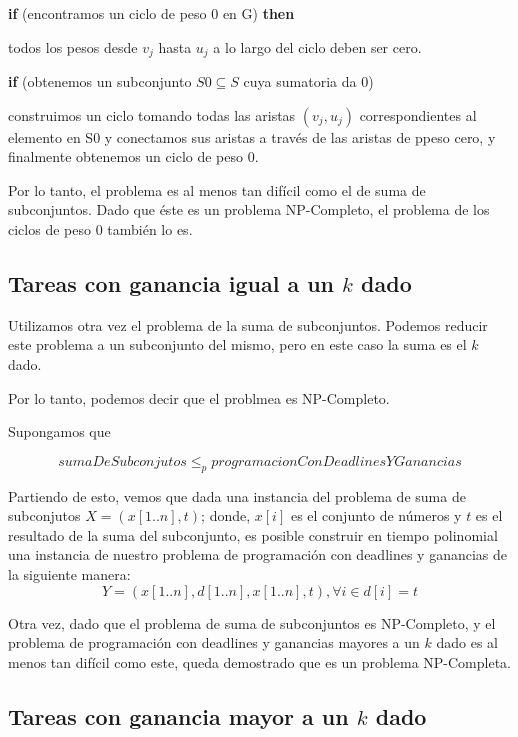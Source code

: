 \documentclass[a4paper,10pt]{article}
\begin{document}
\textbf{\textcolor[rgb]{0.0,0.5019608,0.0}{if}} (encontramos un ciclo de peso 0 en G) \textbf{\textcolor[rgb]{0.0,0.5019608,0.0}{then}}

\quad todos los pesos desde \( v_{j} \) hasta \( u_{j} \) a lo largo del ciclo deben ser cero.
		
\textbf{\textcolor[rgb]{0.0,0.5019608,0.0}{if}} (obtenemos un subconjunto \( S0 \subseteq S \) cuya sumatoria da 0)

\quad construimos un ciclo tomando todas las aristas \( (v_{j}, u_{j}) \) correspondientes al elemento en S0 y conectamos sus aristas a través de las aristas de ppeso cero, y finalmente obtenemos un ciclo de peso 0.

\bigskip

Por lo tanto, el problema es al menos tan difícil como el de suma de subconjuntos. Dado que éste es un problema NP-Completo, el problema de los ciclos de peso 0 también lo es.

\subsection{Tareas con ganancia igual a un \(k\) dado}

Utilizamos otra vez el problema de la suma de subconjuntos. Podemos reducir este problema a un subconjunto del mismo, pero en este caso la suma es el \(k\) dado.

Por lo tanto, podemos decir que el problmea es NP-Completo.

Supongamos que

\[ sumaDeSubconjutos \le_{p} programacionConDeadlinesYGanancias \]

Partiendo de esto, vemos que dada una instancia del problema de suma de subconjutos \(X = (x[1..n], t)\); donde, \(x[i]\) es el conjunto de números y \(t\) es el resultado de la suma del subconjunto, es posible construir en tiempo polinomial una instancia de nuestro problema de programación con deadlines y ganancias de la siguiente manera: 
\[ Y = ( x[1..n], d[1..n], x[1..n], t ), \forall i \in d[i] = t \]

Otra vez, dado que el problema de suma de subconjuntos es NP-Completo, y el problema de programación con deadlines y ganancias mayores a un \(k\) dado es al menos tan difícil como este, queda demostrado que es un problema NP-Completa.

\subsection{Tareas con ganancia mayor a un \(k\) dado}
\end{document}
